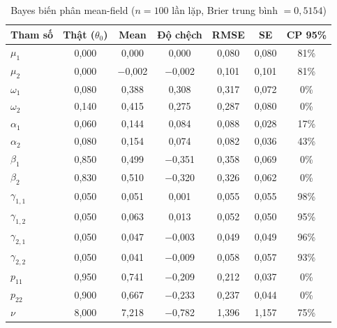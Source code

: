 \documentclass[11pt,a4paper]{article}
\begin{document}
\begin{table}[H]\centering\scriptsize
\caption{Bayes biến phân mean-field ($n=100$ lần lặp, Brier trung bình $=0,5154$)}
\begin{tabularx}{\textwidth}{l C C C C C C}
\toprule
\textbf{Tham số} & \textbf{Thật ($\theta_0$)} & \textbf{Mean} & \textbf{Độ chệch} & \textbf{RMSE} & \textbf{SE} & \textbf{CP 95\%} \\
\midrule
$\mu_1$ & 0,000 & 0,000 & 0,000 & 0,080 & 0,080 & 81\% \\
$\mu_2$ & 0,000 & $-$0,002 & $-$0,002 & 0,101 & 0,101 & 81\% \\
$\omega_1$ & 0,080 & 0,388 & 0,308 & 0,317 & 0,072 & 0\% \\
$\omega_2$ & 0,140 & 0,415 & 0,275 & 0,287 & 0,080 & 0\% \\
$\alpha_1$ & 0,060 & 0,144 & 0,084 & 0,088 & 0,028 & 17\% \\
$\alpha_2$ & 0,080 & 0,154 & 0,074 & 0,082 & 0,036 & 43\% \\
$\beta_1$ & 0,850 & 0,499 & $-$0,351 & 0,358 & 0,069 & 0\% \\
$\beta_2$ & 0,830 & 0,510 & $-$0,320 & 0,326 & 0,062 & 0\% \\
$\gamma_{1,1}$ & 0,050 & 0,051 & 0,001 & 0,055 & 0,055 & 98\% \\
$\gamma_{1,2}$ & 0,050 & 0,063 & 0,013 & 0,052 & 0,050 & 95\% \\
$\gamma_{2,1}$ & 0,050 & 0,047 & $-$0,003 & 0,049 & 0,049 & 96\% \\
$\gamma_{2,2}$ & 0,050 & 0,041 & $-$0,009 & 0,058 & 0,057 & 93\% \\
$p_{11}$ & 0,950 & 0,741 & $-$0,209 & 0,212 & 0,037 & 0\% \\
$p_{22}$ & 0,900 & 0,667 & $-$0,233 & 0,237 & 0,044 & 0\% \\
$\nu$ & 8,000 & 7,218 & $-$0,782 & 1,396 & 1,157 & 75\% \\
\bottomrule
\end{tabularx}
\end{table}
\end{document}
